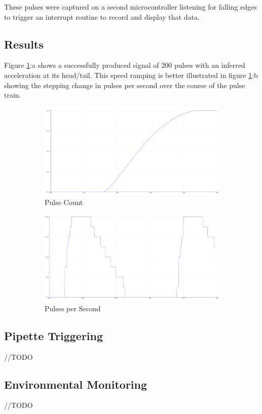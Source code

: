 These pulses were captured on a second microcontroller listening for falling edges to trigger an interrupt routine to record and display that data.

\subsection{Results}

Figure \ref{fig:code}:a shows a successfully produced signal of 200 pulses with an inferred acceleration at its head/tail. This speed ramping is better illustrated in figure \ref{fig:code}:b showing the stepping change in pulses per second over the course of the pulse train.

\begin{figure}[h]
    \centering
    \begin{subfigure}{.45\textwidth}
        \centering
        \includegraphics[width=0.8\linewidth]{img/stepper_pulses.PNG}
        \caption{Pulse Count}
    \end{subfigure}%
    \begin{subfigure}{.45\textwidth}
        \centering
        \includegraphics[width=0.8\linewidth]{img/stepper_pulse_acc.PNG}
        \caption{Pulses per Second}
    \end{subfigure}
    \caption{}
    \label{fig:code}
\end{figure}

\subsection{Pipette Triggering}
//TODO
\subsection{Environmental Monitoring}
//TODO